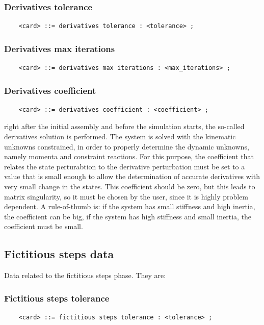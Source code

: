 \documentclass[10pt,dvips]{report}
\begin{document}
\subsubsection{Derivatives tolerance}
\begin{verbatim}
    <card> ::= derivatives tolerance : <tolerance> ;
\end{verbatim}

\subsubsection{Derivatives max iterations}
\begin{verbatim}
    <card> ::= derivatives max iterations : <max_iterations> ;
\end{verbatim}

\subsubsection{Derivatives coefficient}
\begin{verbatim}
    <card> ::= derivatives coefficient : <coefficient> ;
\end{verbatim}
right after the initial assembly and before the simulation starts, the
so-called derivatives solution is performed. The system is solved with
the kinematic unknowns constrained, in order to properly determine the
dynamic unknowns, namely momenta and constraint reactions. For this
purpose, the coefficient that relates the state perturabtion to the
derivative perturbation must be set to a value that is small enough to
allow the determination of accurate derivatives with very small change
in the states. This coefficient should be zero, but this leads to matrix
singularity, so it must be chosen by the user, since it is highly
problem dependent. A rule-of-thumb is: if the system has small
stiffness and high inertia, the coefficient can be big, if the system
has high stiffness and small inertia, the coefficient must be small.


\subsection{Fictitious steps data}
Data related to the fictitious steps phase. They are:

\subsubsection{Fictitious steps tolerance}
\begin{verbatim}
    <card> ::= fictitious steps tolerance : <tolerance> ;
\end{verbatim}
\end{document}
